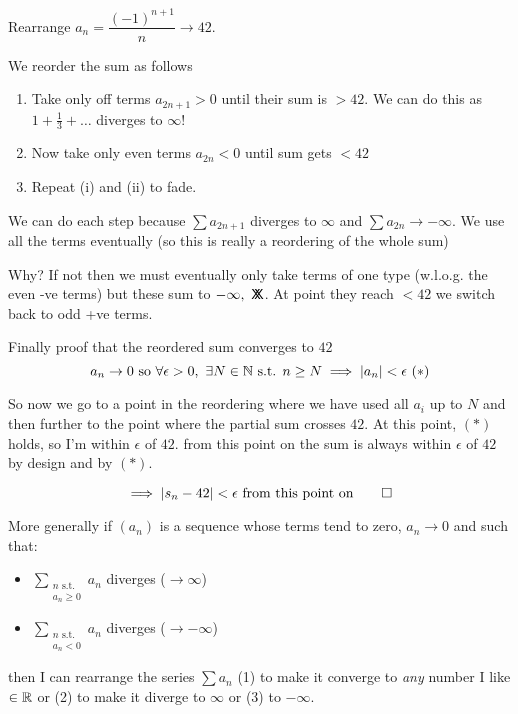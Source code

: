 \begin{example}
Rearrange $a_n = \dfrac{(-1)^{n+1}}{n} \to 42$. 

We reorder the sum as follows
\begin{enumerate}
\item Take only off terms $a_{2n+1} > 0$ until their sum is $>42$. We can do this as $1 + \frac{1}{3} + \dots$ diverges to $\infty$!
\item Now take only even terms $a_{2n} < 0$ until sum gets $<42$
\item Repeat (i) and (ii) to fade.
\end{enumerate}


We can do each step because $\sum a_{2n+1}$ diverges to $\infty$ and $\sum a_{2n}\to -\infty$. We use all the terms eventually (so this is really a reordering of the whole sum)

Why? If not then we must eventually only take terms of one type (w.l.o.g. the even -ve terms) but these sum to $-\infty,~\mathsf{X}\mkern-8.5mu\mathsf{X}$. At point they reach $<42$ we switch back to odd +ve terms.

Finally proof that the reordered sum converges to $42$ 
\[a_n \to 0 \text{ so }\forall \epsilon >0,~\exists N \in\mathbb{N} \text{ s.t. } n \geq N \implies |a_n| < \epsilon ~(*)\]

So now we go to a point in the reordering where we have used all $a_i$ up to $N$ and then further to the point where the partial sum crosses $42$. At this point, $(*)$ holds, so I'm within $\epsilon$ of $42$. from this point on the sum is always within $\epsilon$ of $42$ by design and by $(*)$. 

\[\implies |s_n - 42| < \epsilon \text{ from this point on}\qed\]
\end{example}


More generally 
 if $(a_n)$ is a sequence whose terms tend to zero, $a_n \to 0$ and such that: \begin{itemize}
 \item $\displaystyle{\sum_{\substack{n \text{ s.t.} \\a_n \geq 0}} a_n}$ diverges ($\to \infty$)
 \item $\displaystyle{\sum_{\substack{n \text{ s.t.}\\ a_n < 0}}  a_n}$ diverges ($\to -\infty$)	
 \end{itemize}
 then I can rearrange the series $\sum a_n$ (1) to make it converge to \emph{any} number I like $\in\mathbb{R}$ or (2) to  make it diverge to $\infty$ or (3) to $-\infty$. 
 
